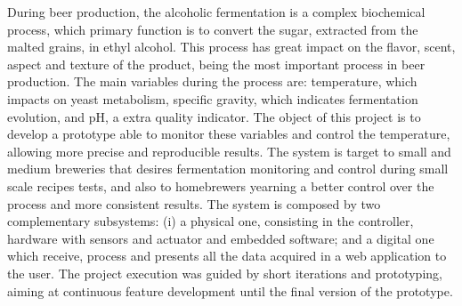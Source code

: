 During beer production, the alcoholic fermentation is a complex biochemical process, which primary function is to convert the sugar, extracted from the malted grains, in ethyl alcohol. This process has great impact on the flavor, scent, aspect and texture of the product, being the most important process in beer production.
The main variables during the process are: temperature, which impacts on yeast metabolism, specific gravity, which indicates fermentation evolution, and pH, a extra quality indicator.
The object of this project is to develop a prototype able to monitor these variables and control the temperature, allowing more precise and reproducible results. The system is target to small and medium breweries that desires fermentation monitoring and control during small scale recipes tests, and also to homebrewers yearning a better control over the process and more consistent results.
The system is composed by two complementary subsystems: (i) a physical one, consisting in the controller, hardware with sensors and actuator and embedded software; and a digital one which receive, process and presents all the data acquired in a web application to the user.
The project execution was guided by short iterations and prototyping, aiming at continuous feature development until the final version of the prototype.